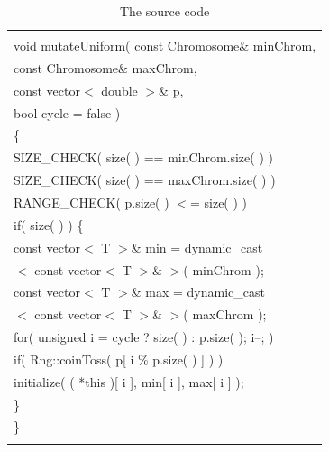 \documentclass[twocolumn]{article}
\begin{document}
\begin{table}[h] 
\begin{center}
\caption{The source code}
\label{SC7-2}
{\scriptsize
\begin{tabular}{|l|}\hline
\hspace*{7cm}\\
void mutateUniform( const Chromosome\& minChrom,\\
\hspace*{4mm} const Chromosome\& maxChrom,\\
\hspace*{4mm} const vector$<$ double $>$\& p,\\
\hspace*{4mm} bool cycle = false )\\
\{\\
\hspace*{4mm} SIZE\_CHECK( size( ) == minChrom.size( ) )\\
\hspace*{4mm} SIZE\_CHECK( size( ) == maxChrom.size( ) )\\
\hspace*{4mm} RANGE\_CHECK( p.size( ) $<$= size( ) )\\
\hspace*{4mm} if( size( ) ) \{\\
\hspace*{8mm} const vector$<$ T $>$\& min = dynamic\_cast \\
\hspace*{12mm} $<$ const vector$<$ T $>$\& $>$( minChrom );\\
\hspace*{8mm} const vector$<$ T $>$\& max = dynamic\_cast \\
\hspace*{12mm} $<$ const vector$<$ T $>$\& $>$( maxChrom );\\
\hspace*{8mm} for( unsigned i = cycle ? size( ) : p.size( ); i--; )\\
\hspace*{12mm} if( Rng::coinToss( p[ i \% p.size( ) ] ) )\\
\hspace*{16mm} initialize( ( *this )[ i ], min[ i ], max[ i ] );\\
\hspace*{4mm} \}\\
\}\\
\hspace*{7cm}\\\hline
\end{tabular}
}
\end{center}
\end{table}
\end{document}
